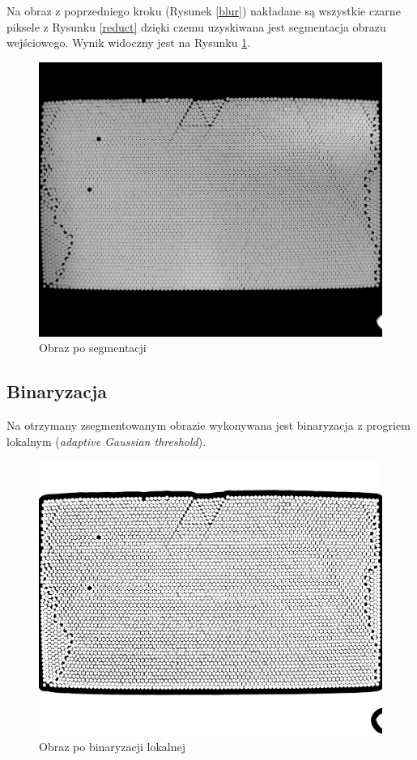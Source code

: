 \documentclass[12pt]{article}
\begin{document}
Na obraz z poprzedniego kroku (Rysunek \ref{blur}) nakładane są wszystkie czarne piksele z Rysunku \ref{reduct} dzięki czemu uzyskiwana jest segmentacja obrazu wejściowego. Wynik widoczny jest na Rysunku \ref{segmented}.

\begin{figure}[H]
\centering \includegraphics[scale=0.108]{step3.png}
\caption{Obraz po segmentacji}
\label{segmented}
\end{figure}

\subsection{Binaryzacja}
Na otrzymany zsegmentowanym obrazie wykonywana jest binaryzacja z progriem lokalnym (\textit{adaptive Gaussian threshold}).

\begin{figure}[H]
\centering \includegraphics[scale=0.108]{step4.png}
\caption{Obraz po binaryzacji lokalnej}
\label{binary}
\end{figure}
\end{document}
